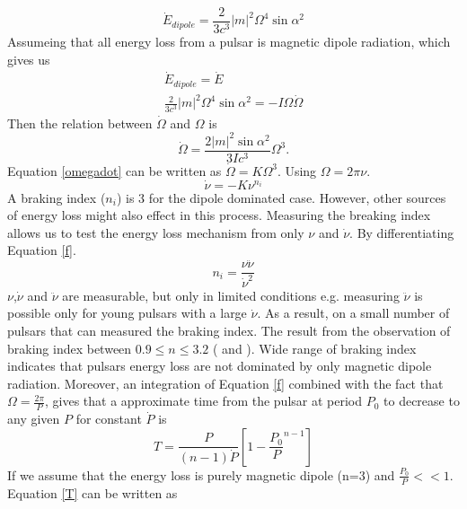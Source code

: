 \documentclass[thesis_msc.tex]{subfiles}
\begin{document}
   \begin{equation} \label{Edotdipole}
   \dot{E}_{dipole}=\frac{2}{3c^3}|m|^2\Omega^4 \sin{\alpha}^2
   \end{equation}
   Assumeing that all energy loss from a pulsar is magnetic dipole radiation, which gives us 
   \begin{eqnarray} 
   \dot{E}_{dipole}=\dot{E}\\
   \frac{2}{3c^3}|m|^2\Omega^4 \sin{\alpha}^2=-I\Omega\dot{\Omega}
   \end{eqnarray}
   Then the relation between $\dot{\Omega}$ and $\Omega$ is
   \begin{equation} \label{omegadot}
   \dot{\Omega}=\frac{2|m|^2\sin{\alpha}^2}{3Ic^3}\Omega^3.
   \end{equation}
   Equation \ref{omegadot} can be written as $\dot{\Omega}=K\Omega^3$. Using $\Omega=2\pi \nu$.
   \begin{equation} \label{f}
   \dot{\nu}=-K\nu^{n_i}
   \end{equation}
 A braking index ($n_i$) is 3 for the dipole dominated case. However, other sources of energy loss might also effect in this process. Measuring the breaking index allows us to test the energy loss mechanism from only $\nu$ and $\dot{\nu}$. By differentiating Equation \ref{f}.
   \begin{equation} \label{index}
   n_i=\frac{\nu \ddot{\nu}}{\dot{\nu}^2}
   \end{equation}
    $\nu$,$\dot{\nu}$ and $\ddot{\nu}$ are measurable, but only in limited conditions e.g. measuring  $\ddot{\nu}$ is possible only for young pulsars with a large $\dot{\nu}$. As a result, on a small number of pulsars that can measured the braking index. The result from the observation of braking index between $0.9 \leq n \leq  3.2$ ( \cite{Hamil:2015hqa} and \cite{Archibald:2016hxz}). Wide range of braking index indicates that pulsars energy loss are not dominated by only magnetic dipole radiation. Moreover, an integration of Equation \ref{f} combined with the fact that $\Omega=\frac{2\pi}{P}$, gives that a approximate time from the pulsar at period $P_0$ to decrease to any given $P$ for constant $\dot{P}$ is
    \begin{equation} \label{T}
   T=\frac{P}{(n-1)\dot{P}}[1-\frac{P_0}{P}^{n-1}]
   \end{equation}
   If we assume that the energy loss is purely magnetic dipole (n=3) and $\frac{P_0}{P}<<1$. Equation \ref{T} can be written as  
   
\end{document}
